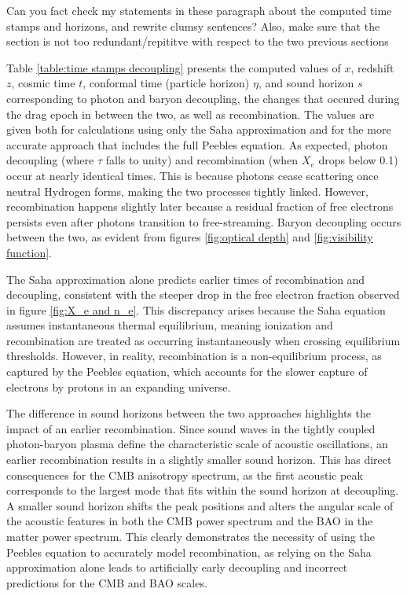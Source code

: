 \documentclass{aa}
\numberwithin{equation}{section}
\numberwithin{table}{section}
\numberwithin{figure}{section}
\begin{document}
Can you fact check my statements in these paragraph about the computed time stamps and horizons, and rewrite clumsy sentences? Also, make sure that the section is not too redundant/repititve with respect to the two previous sections

Table \ref{table:time stamps decoupling} presents the computed values of $x$, redshift $z$, cosmic time $t$, conformal time (particle horizon) $\eta$, and sound horizon $s$ corresponding to photon and baryon decoupling, the changes that occured during the drag epoch in between the two, as well as recombination. The values are given both for calculations using only the Saha approximation and for the more accurate approach that includes the full Peebles equation. As expected, photon decoupling (where $\tau$ falls to unity) and recombination (when $X_e$ drops below 0.1) occur at nearly identical times. This is because photons cease scattering once neutral Hydrogen forms, making the two processes tightly linked. However, recombination happens slightly later because a residual fraction of free electrons persists even after photons transition to free-streaming. Baryon decoupling occurs between the two, as evident from figures \ref{fig:optical depth} and \ref{fig:visibility function}. 

The Saha approximation alone predicts earlier times of recombination and decoupling, consistent with the steeper drop in the free electron fraction observed in figure \ref{fig:X_e and n_e}. This discrepancy arises because the Saha equation assumes instantaneous thermal equilibrium, meaning ionization and recombination are treated as occurring instantaneously when crossing equilibrium thresholds. However, in reality, recombination is a non-equilibrium process, as captured by the Peebles equation, which accounts for the slower capture of electrons by protons in an expanding universe.

The difference in sound horizons between the two approaches highlights the impact of an earlier recombination. Since sound waves in the tightly coupled photon-baryon plasma define the characteristic scale of acoustic oscillations, an earlier recombination results in a slightly smaller sound horizon. This has direct consequences for the CMB anisotropy spectrum, as the first acoustic peak corresponds to the largest mode that fits within the sound horizon at decoupling. A smaller sound horizon shifts the peak positions and alters the angular scale of the acoustic features in both the CMB power spectrum and the BAO in the matter power spectrum. This clearly demonstrates the necessity of using the Peebles equation to accurately model recombination, as relying on the Saha approximation alone leads to artificially early decoupling and incorrect predictions for the CMB and BAO scales.
\end{document}
